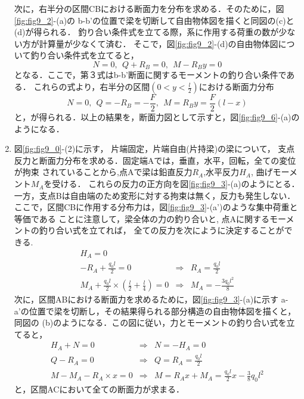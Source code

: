 \documentclass[10pt,a4j]{jarticle}
\begin{document}
\begin{enumerate}
次に，右半分の区間CBにおける断面力を分布を求める．そのために，図\ref{fig:fig9_2}-(a)の
b-b'の位置で梁を切断して自由物体図を描くと同図の(c)と(d)が得られる．
釣り合い条件式を立てる際，系に作用する荷重の数が少ない方が計算量が少なくて済む．
そこで，図\ref{fig:fig9_2}-(d)の自由物体図について釣り合い条件式を立てると，
\begin{equation}
	N=0, \ \ Q+R_B=0, \ \ M-R_By=0
	\label{eqn:}
\end{equation}
となる．ここで，第３式はb-b'断面に関するモーメントの釣り合い条件である．
これらの式より，右半分の区間$(0<y<\frac{l}{2})$における断面力分布
\begin{equation}
	N=0, \ \ Q=-R_B=-\frac{F}{2}, \ \ M=R_By =\frac{F}{2}\left(l-x\right)
	\label{eqn:}
\end{equation}
と，が得られる．以上の結果を，断面力図として示すと，図\ref{fig:fig9_6}-(a)のようになる．
\item
図\ref{fig:fig9_0}-(2)に示す， 片端固定，片端自由(片持梁)の梁について，
支点反力と断面力分布を求める．固定端Aでは，垂直，水平，回転，全ての変位が拘束
されていることから,点Aで梁は鉛直反力$R_A$,水平反力$H_A$, 曲げモーメント$M_A$を受ける．
これらの反力の正方向を図\ref{fig:fig9_3}-(a)のようにとる．
一方，支点Bは自由端のため変形に対する拘束は無く，反力も発生しない．
ここで，区間CBに作用する分布力は，図\ref{fig:fig9_3}-(a')のような集中荷重と等価である
ことに注意して，梁全体の力の釣り合いと, 点Aに関するモーメントの釣り合い式を立てれば，
全ての反力を次にように決定することができる.
\begin{eqnarray}
	H_A=0 & &  \\
	-R_A+\frac{q_0l}{2}=0 &\Rightarrow & R_A=\frac{q_0l}{2} \\
	M_A+\frac{q_0l}{2}\times \left(\frac{l}{2}+\frac{l}{4}\right)=0
	& \Rightarrow & M_A=-\frac{3q_0l^2}{8}
\end{eqnarray}
次に，区間ABにおける断面力を求めるために，図\ref{fig:fig9_3}-(a)に示す
a-a'の位置で梁を切断し，その結果得られる部分構造の自由物体図を描くと，同図の
(b)のようになる．この図に従い，力とモーメントの釣り合い式を立てると，
\begin{eqnarray}
	H_A+N=0 
	& \Rightarrow & 
	N=-H_A=0
	\label{eqn:} \\
	Q-R_A=0 
	& \Rightarrow & 
	Q=R_A=\frac{q_0l}{2}
	\label{eqn:} \\
	M-M_A-R_A\times x =0 
	& \Rightarrow & 
	M=R_Ax+M_A= \frac{q_0l}{2}x-\frac{3}{8}q_0l^2 
	\label{eqn:}
\end{eqnarray}
と，区間ACにおいて全ての断面力が求まる．


\end{enumerate}
\end{document}
